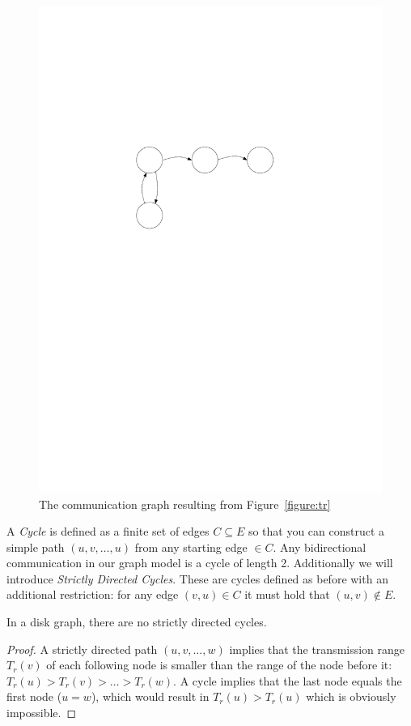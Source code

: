 \begin{figure}[ht]
\center
\includegraphics[scale=0.7]{figures/resultinggraph.pdf}
\caption{The communication graph resulting from Figure~\ref{figure:tr}}
\end{figure}


A \textit{Cycle} is defined as a finite set of edges $C \subseteq E$ so that you can construct a simple path $(u, v, \dots, u)$ from any starting edge $\in C$. Any bidirectional communication in our graph model is a cycle of length 2. Additionally we will introduce \textit{Strictly Directed Cycles}. These are cycles defined as before with an additional restriction: for any edge $(v, u) \in C$ it must hold that $(u, v) \notin E$.

\begin{lemma}
	In a disk graph, there are no strictly directed cycles.
\end{lemma}
\begin{proof}
	A strictly directed path $(u, v, \dots, w)$ implies that the transmission range $T_r(v)$ of each following node is smaller than the range of the node before it:
	$T_r(u)>T_r(v)>\dots>T_r(w)$. A cycle implies that the last node equals the first node ($u=w$), which would result in $T_r(u) > T_r(u)$ which is obviously impossible.
\end{proof}


